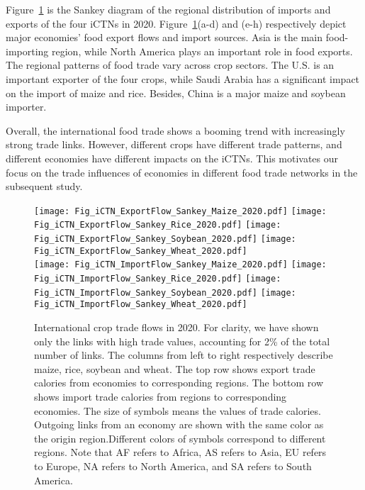 \documentclass[preprint,3p,times,sort&compress]{elsarticle}
\begin{document}
Figure~\ref{Fig:iCTN:TradeFlow:Sankey} is the Sankey diagram of the regional distribution of imports and exports of the four iCTNs in 2020. Figure~\ref{Fig:iCTN:TradeFlow:Sankey}(a-d) and (e-h) respectively depict major economies' food export flows and import sources. Asia is the main food-importing region, while North America plays an important role in food exports. The regional patterns of food trade vary across crop sectors. The U.S. is an important exporter of the four crops, while Saudi Arabia has a significant impact on the import of maize and rice. Besides, China is a major maize and soybean importer.
 
Overall, the international food trade shows a booming trend with increasingly strong trade links. However, different crops have different trade patterns, and different economies have different impacts on the iCTNs. This motivates our focus on the trade influences of economies in different food trade networks in the subsequent study.


\begin{figure}[h!]
    \centering
    \texttt{[image: Fig\_iCTN\_ExportFlow\_Sankey\_Maize\_2020.pdf]}
    \texttt{[image: Fig\_iCTN\_ExportFlow\_Sankey\_Rice\_2020.pdf]}
    \texttt{[image: Fig\_iCTN\_ExportFlow\_Sankey\_Soybean\_2020.pdf]}
    \texttt{[image: Fig\_iCTN\_ExportFlow\_Sankey\_Wheat\_2020.pdf]}\\
    \texttt{[image: Fig\_iCTN\_ImportFlow\_Sankey\_Maize\_2020.pdf]}
    \texttt{[image: Fig\_iCTN\_ImportFlow\_Sankey\_Rice\_2020.pdf]}
    \texttt{[image: Fig\_iCTN\_ImportFlow\_Sankey\_Soybean\_2020.pdf]}
    \texttt{[image: Fig\_iCTN\_ImportFlow\_Sankey\_Wheat\_2020.pdf]}
    \caption{International crop trade flows in 2020. For clarity, we have shown only the links with high trade values, accounting for 2\% of the total number of links. The columns from left to right respectively describe maize, rice, soybean and wheat. The top row shows export trade calories from economies to corresponding regions. The bottom row shows import trade calories from regions to corresponding economies. The size of symbols means the values of trade calories. Outgoing links from an economy are shown with the same color as the origin region.Different colors of symbols correspond to different regions. Note that AF refers to Africa, AS refers to Asia, EU refers to Europe, NA refers to North America, and SA refers to South America.}
    \label{Fig:iCTN:TradeFlow:Sankey}
\end{figure}
\end{document}
